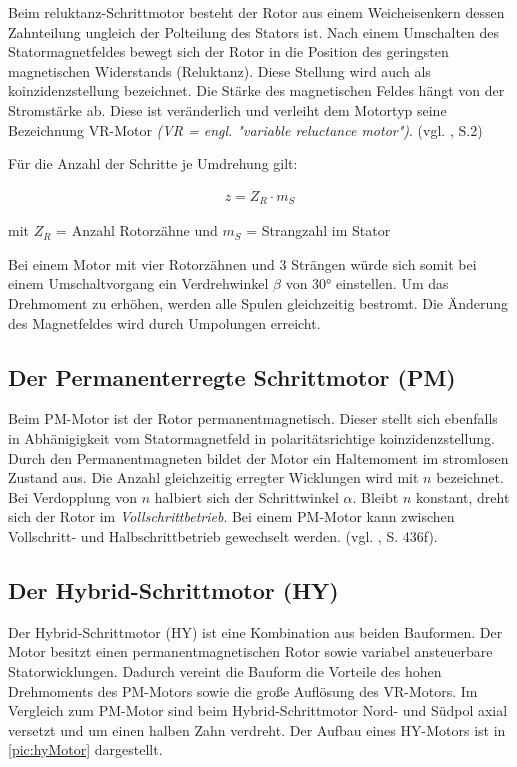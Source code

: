 Beim \acrshort{reluktanz}-Schrittmotor besteht der Rotor aus einem Weicheisenkern dessen Zahnteilung ungleich der Polteilung des Stators ist. Nach einem Umschalten des Statormagnetfeldes bewegt sich der Rotor in die Position des geringsten magnetischen Widerstands (Reluktanz). Diese Stellung wird auch als \acrshort{koinzidenzstellung} bezeichnet. Die Stärke des magnetischen Feldes hängt von der Stromstärke ab. Diese ist veränderlich und verleiht dem Motortyp seine Bezeichnung VR-Motor \textit{(VR = engl. "variable reluctance motor")}. (vgl. \cite{schrittmotorBa}, S.2)

Für die Anzahl der Schritte je Umdrehung gilt: 

\begin{align}
	z = Z_R\cdot m_S 
\end{align}
\begin{center}
	mit $Z_R$ = Anzahl Rotorzähne und  $m_S$  = Strangzahl im Stator
\end{center}

Bei einem Motor mit vier Rotorzähnen und 3 Strängen würde sich somit bei einem Umschaltvorgang ein Verdrehwinkel $\beta$ von 30° einstellen. Um das Drehmoment zu erhöhen, werden alle Spulen gleichzeitig bestromt. Die Änderung des Magnetfeldes wird durch Umpolungen erreicht. 

\subsection{Der Permanenterregte Schrittmotor (PM)}
Beim PM-Motor ist der Rotor permanentmagnetisch. Dieser stellt sich ebenfalls in Abhänigigkeit vom Statormagnetfeld in polaritätsrichtige \acrshort{koinzidenzstellung}. Durch den Permanentmagneten bildet der Motor ein Haltemoment im stromlosen Zustand aus. Die Anzahl gleichzeitig erregter Wicklungen wird mit $n$ bezeichnet. Bei Verdopplung von $n$ halbiert sich der Schrittwinkel $\alpha$. Bleibt $n$ konstant, dreht sich der Rotor im \textit{Vollschrittbetrieb}. Bei einem PM-Motor kann zwischen Vollschritt- und Halbschrittbetrieb gewechselt werden. (vgl. \cite{kleinantriebe}, S. 436f). \newpage

\subsection{Der Hybrid-Schrittmotor (HY)}
Der Hybrid-Schrittmotor (HY) ist eine Kombination aus beiden Bauformen. Der Motor besitzt einen permanentmagnetischen Rotor sowie variabel ansteuerbare Statorwicklungen. Dadurch vereint die Bauform die Vorteile des hohen Drehmoments des PM-Motors sowie die große Auflösung des VR-Motors. Im Vergleich zum PM-Motor sind beim Hybrid-Schrittmotor Nord- und Südpol axial versetzt und um einen halben Zahn verdreht. Der Aufbau eines HY-Motors ist in \autoref{pic:hyMotor} dargestellt. 


